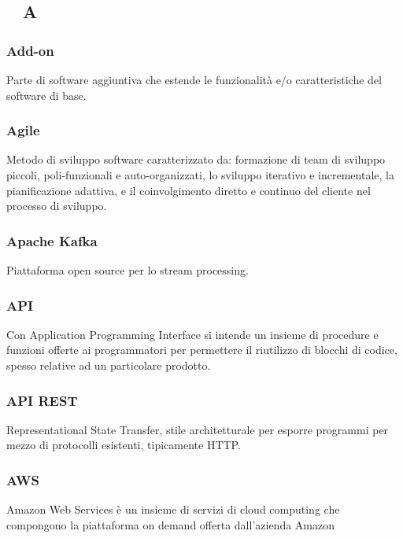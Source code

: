 \subsection*{$\quad$A$\quad$}
\subsubsection*{Add-on}
Parte di software aggiuntiva che estende le funzionalità e/o caratteristiche del software di base.

\subsubsection*{Agile}
Metodo di sviluppo software caratterizzato da: formazione di team di sviluppo piccoli, poli-funzionali e auto-organizzati, lo sviluppo iterativo e incrementale, la pianificazione adattiva, e il coinvolgimento diretto e continuo del cliente nel processo di sviluppo.

\subsubsection*{Apache Kafka}
Piattaforma open source per lo stream processing.

\subsubsection*{API}
Con Application Programming Interface si intende un insieme di procedure e funzioni offerte ai programmatori per permettere il riutilizzo di blocchi di codice, spesso relative ad un particolare prodotto. 

\subsubsection*{API REST}
Representational State Transfer, stile architetturale per esporre programmi per mezzo di protocolli esistenti, tipicamente HTTP.

\subsubsection*{AWS}
Amazon Web Services è un insieme di servizi di cloud computing che compongono la piattaforma on demand offerta dall'azienda Amazon

